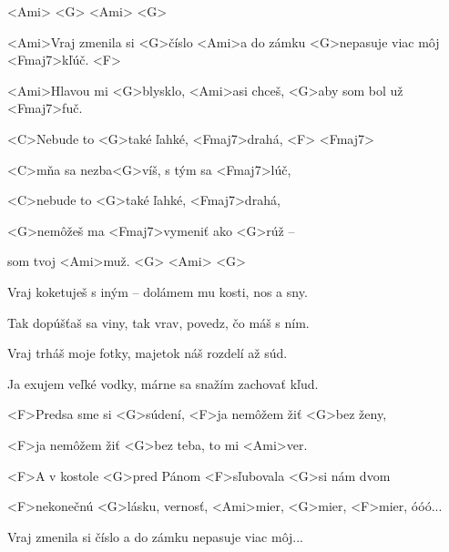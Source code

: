


<Ami> <G> <Ami> <G>

\zs
<Ami>Vraj zmenila si <G>číslo <Ami>a do zámku <G>nepasuje viac môj <Fmaj7>kľúč. <F>

<Ami>Hlavou mi <G>blysklo, <Ami>asi chceš, <G>aby som bol už <Fmaj7>fuč.
\ks

\zr
<C>Nebude to <G>také ľahké, <Fmaj7>drahá, <F> <Fmaj7>

<C>mňa sa nezba<G>víš, s tým sa <Fmaj7>lúč,

<C>nebude to <G>také ľahké, <Fmaj7>drahá,

<G>nemôžeš ma <Fmaj7>vymeniť ako <G>rúž --

som tvoj <Ami>muž. <G> <Ami> <G>
\kr

\zs
Vraj koketuješ s iným -- dolámem mu kosti, nos a sny.

Tak dopúšťaš sa viny, tak vrav, povedz, čo máš s ním.
\ks

\zr \kr

\zs
Vraj trháš moje fotky, majetok náš rozdelí až súd.

Ja exujem veľké vodky, márne sa snažím zachovať kľud.
\ks

\zr \kr

\zs
<F>Predsa sme si <G>súdení, <F>ja nemôžem žiť <G>bez ženy,

<F>ja nemôžem žiť <G>bez teba, to mi <Ami>ver.

<F>A v kostole <G>pred Pánom <F>sľubovala <G>si nám dvom

<F>nekonečnú <G>lásku, vernosť, <Ami>mier, <G>mier, <F>mier, óóó...
\ks

\zr \kr

\zs
Vraj zmenila si číslo a do zámku nepasuje viac môj...
\ks

\kp
